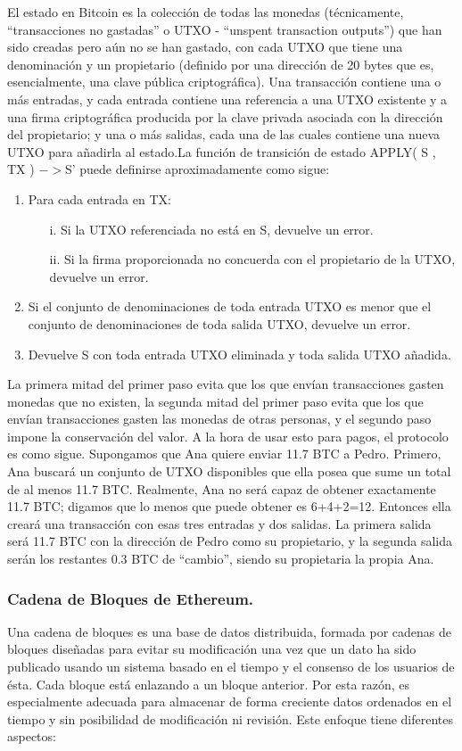 \documentclass[11pt,a4paper]{article}
\begin{document}
El estado en Bitcoin es la colección de todas las monedas (técnicamente, “transacciones no gastadas” o UTXO - “unspent transaction outputs”) que han sido creadas pero aún no se han gastado, con cada UTXO que tiene una denominación y un propietario (definido por una dirección de 20 bytes que es, esencialmente, una clave pública criptográfica). Una transacción contiene una o más entradas, y cada entrada contiene una referencia a una UTXO existente y a una firma criptográfica producida por la clave privada asociada con la dirección del propietario; y una o más salidas, cada una de las cuales contiene una nueva UTXO para añadirla al estado.La función de transición de estado APPLY( S , TX ) $->$S' puede definirse aproximadamente como sigue:
\begin{enumerate}
\item Para cada entrada en TX:
  \begin{enumerate}
  \item[i.] Si la UTXO referenciada no está en S, devuelve un error.
  \item[ii.] Si la firma proporcionada no concuerda con el propietario de la UTXO, devuelve un error.
  \end{enumerate}
\item Si el conjunto de denominaciones de toda entrada UTXO es menor que el conjunto de
  denominaciones de toda salida UTXO, devuelve un error.
\item Devuelve S con toda entrada UTXO eliminada y toda salida UTXO añadida.
  
\end{enumerate}
La primera mitad del primer paso evita que los que envían transacciones gasten monedas que no existen, la segunda mitad del primer paso evita que los que envían transacciones gasten las monedas de otras personas, y el segundo paso impone la conservación del valor. A la hora de usar esto para pagos, el protocolo es como sigue. Supongamos que Ana quiere enviar 11.7 BTC a Pedro. Primero, Ana buscará un conjunto de UTXO disponibles que ella posea que sume un total de al menos 11.7 BTC. Realmente, Ana no será capaz de obtener exactamente 11.7 BTC; digamos que lo menos que puede obtener es 6+4+2=12. Entonces ella creará una transacción con esas tres entradas y dos salidas. La primera salida será 11.7 BTC con la dirección de Pedro como su propietario, y la segunda salida serán los restantes 0.3 BTC de “cambio”, siendo su propietaria la propia Ana.

\subsubsection{Cadena de Bloques de Ethereum.}
Una cadena de bloques es una base de datos distribuida, formada por cadenas de bloques diseñadas para evitar su modificación una vez que un dato ha sido publicado usando un sistema basado en el tiempo y el consenso de los usuarios de ésta. Cada bloque está enlazando a un bloque anterior. Por esta razón, es especialmente adecuada para almacenar de forma creciente datos ordenados en el tiempo y sin posibilidad de modificación ni revisión. Este enfoque tiene diferentes aspectos:
\end{document}
